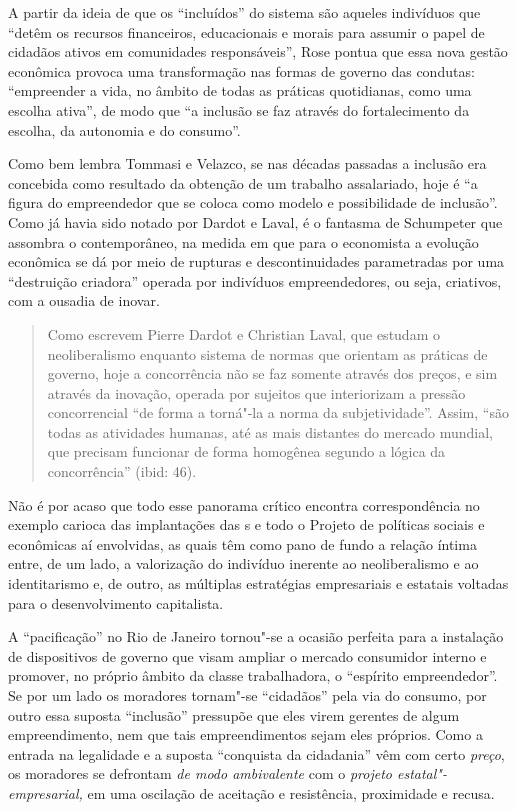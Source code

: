 A partir da ideia de que os ``incluídos'' do sistema são aqueles
indivíduos que ``detêm os recursos financeiros, educacionais e morais
para assumir o papel de cidadãos ativos em comunidades responsáveis'',
Rose pontua que essa nova gestão econômica provoca uma transformação nas
formas de governo das condutas: ``empreender a vida, no âmbito de todas
as práticas quotidianas, como uma escolha ativa'', de modo que ``a
inclusão se faz através do fortalecimento da escolha, da autonomia e do
consumo''.

Como bem lembra Tommasi e Velazco, se nas décadas passadas a inclusão
era concebida como resultado da obtenção de um trabalho assalariado,
hoje é ``a figura do empreendedor que se coloca como modelo e
possibilidade de inclusão''. Como já havia sido notado por Dardot e
Laval, é o fantasma de Schumpeter que assombra o contemporâneo, na
medida em que para o economista a evolução econômica se dá por meio de
rupturas e descontinuidades parametradas por uma ``destruição criadora''
operada por indivíduos empreendedores, ou seja, criativos, com a ousadia
de inovar.

\begin{quote}
Como escrevem Pierre Dardot e Christian Laval, que estudam o
neoliberalismo enquanto sistema de normas que orientam as práticas de
governo, hoje a concorrência não se faz somente através dos preços, e
sim através da inovação, operada por sujeitos que interiorizam a pressão
concorrencial ``de forma a torná"-la a norma da subjetividade''. Assim,
``são todas as atividades humanas, até as mais distantes do mercado
mundial, que precisam funcionar de forma homogênea segundo a lógica da
concorrência'' (ibid: 46).
\end{quote}

Não é por acaso que todo esse panorama crítico encontra correspondência
no exemplo carioca das implantações das s e todo o Projeto de
políticas sociais e econômicas aí envolvidas, as quais têm como pano de
fundo a relação íntima entre, de um lado, a valorização do indivíduo
inerente ao neoliberalismo e ao identitarismo e, de outro, as múltiplas
estratégias empresariais e estatais voltadas para o desenvolvimento
capitalista.

A ``pacificação'' no Rio de Janeiro tornou"-se a ocasião perfeita para a
instalação de dispositivos de governo que visam ampliar o mercado
consumidor interno e promover, no próprio âmbito da classe trabalhadora,
o ``espírito empreendedor''. Se por um lado os moradores tornam"-se
``cidadãos'' pela via do consumo, por outro essa suposta ``inclusão''
pressupõe que eles virem gerentes de algum empreendimento, nem que tais
empreendimentos sejam eles próprios. Como a entrada na legalidade e a
suposta ``conquista da cidadania'' vêm com certo \emph{preço}, os
moradores se defrontam \emph{de modo ambivalente} com o \emph{projeto
estatal"-empresarial,} em uma oscilação de aceitação e resistência,
proximidade e recusa.

